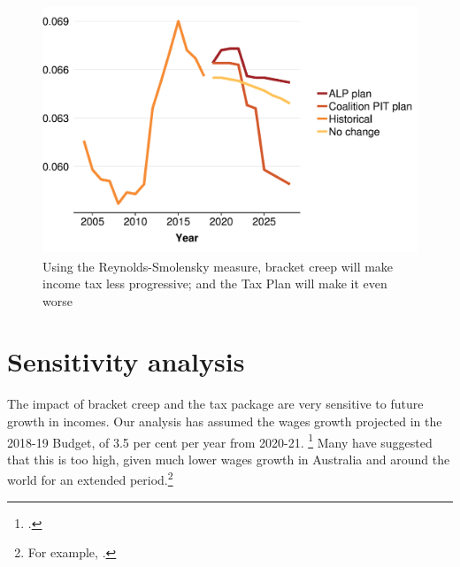 \documentclass[submission]{grattan}\usepackage[]{graphicx}\usepackage[]{color}
\newenvironment{knitrout}{}{} %
\begin{document}
\begin{figure}
\caption{Using the Reynolds-Smolensky measure, bracket creep will make income tax less progressive; and the Tax Plan will make it even worse}\label{fig:progressivity}
\begin{knitrout}
\color{fgcolor}
\includegraphics[width=4.47222in,height=2.92631723826715in]{atlas/progressivities-1} 

\end{knitrout}
\end{figure}

\section{Sensitivity analysis}\label{sec:sensitivity-analysis}

The impact of bracket creep and the tax package are very sensitive to future growth in incomes. Our analysis has assumed the wages growth projected in the 2018-19 Budget, of 3.5 per cent per year from 2020-21.%
  \footcite[][1--10]{Treasury2018a}
Many have suggested that this is too high, given much lower wages growth in Australia and around the world for an extended period.\footnote{For example, \textcite{Knaus}.}
\end{document}
